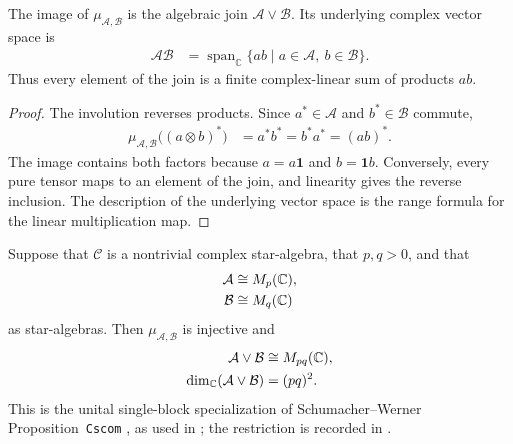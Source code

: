 \begin{lemma}
    \label{thm:qca_commuting_factor_product}
    \leanok
    The image of $\mu_{\mathcal A,\mathcal B}$ is the algebraic join
    $\mathcal A\vee\mathcal B$.  Its underlying complex vector space is
    \begin{align}
        \mathcal A\mathcal B
         & =\operatorname{span}_{\mathbb C}
        \{ab\mid a\in\mathcal A,\ b\in\mathcal B\}.
        \label{eq:qca_commuting_factor_product_span}
    \end{align}
    Thus every element of the join is a finite complex-linear sum of
    products $ab$.
\end{lemma}

\begin{proof}\leanok
    The involution reverses products.  Since $a^*\in\mathcal A$ and
    $b^*\in\mathcal B$ commute,
    \begin{align}
        \mu_{\mathcal A,\mathcal B}\bigl((a\otimes b)^*\bigr)
         & =a^*b^*=b^*a^*=(ab)^*.
    \end{align}
    The image contains both factors because $a=a\mathbf 1$ and
    $b=\mathbf 1b$.  Conversely, every pure tensor maps to an element of
    the join, and linearity gives the reverse inclusion.  The description
    of the underlying vector space is the range formula for the linear
    multiplication map.
\end{proof}

\begin{lemma}
    \label{thm:qca_commuting_full_matrix_product}
    \leanok
    Suppose that $\mathcal C$ is a nontrivial complex star-algebra,
    that $p,q>0$, and that
    \begin{align}
        \mathcal A & \cong M_p(\mathbb C), \notag \\
        \mathcal B & \cong M_q(\mathbb C)
    \end{align}
    as star-algebras.  Then $\mu_{\mathcal A,\mathcal B}$ is injective and
    \begin{align}
        \mathcal A\vee\mathcal B
         & \cong M_{pq}(\mathbb C), \notag \\
        \dim_{\mathbb C}(\mathcal A\vee\mathcal B)
         & =(pq)^2.
        \label{eq:qca_commuting_full_matrix_product}
    \end{align}
    This is the unital single-block specialization of Schumacher--Werner
    Proposition~\texttt{Cscom}
    \cite[lines~2119--2138]{SchumacherWerner2004QCA}, as used in
    \cite[lines~1270--1308]{Gross2012IndexTheory}; the restriction is
    recorded in \cite{gap:gnvw12_cscom_single_block_scope}.
\end{lemma}


